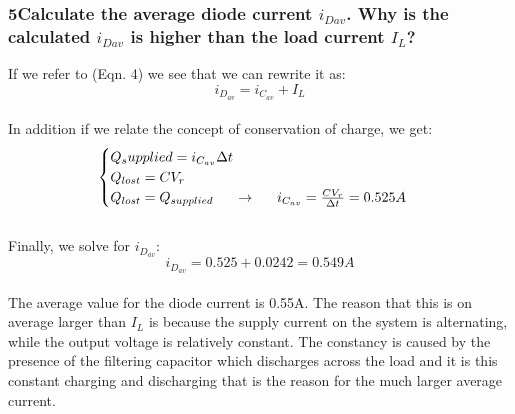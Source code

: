 \documentclass[]{article}
\begin{document}
	\subsubsection*{5\indent Calculate the average diode current $i_{Dav}$. Why is the calculated $i_{Dav}$ is higher than the load current $I_L$?}
	{
		If we refer to (Eqn. 4) we see that we can rewrite it as:
		\begin{equation}
			{ i_{D_{av}} = i_{C_{av}} + I_L }
		\end{equation}
		\\
		In addition if we relate the concept of conservation of charge, we get:
		\begin{equation}
			\begin{cases}
				Q_supplied = i_{C_{av}}\Delta t
				\\
				Q_{lost} = CV_r
				\\
				Q_{lost} = Q_{supplied} \indent\rightarrow\indent i_{C_{av}} = \frac{CV_r}{\Delta t} = 0.525A
				\\
			\end{cases}
		\end{equation}
		\\
		Finally, we solve for $i_{D_{av}}$:
		\begin{equation}
			i_{D_{av}} = 0.525 + 0.0242 = 0.549A
		\end{equation}
		\\
		The average value for the diode current is 0.55A. The reason that this is on average larger than $I_L$ is because the supply current on the system is alternating, while the output voltage is relatively constant. The constancy is caused by the presence of the filtering capacitor which discharges across the load and it is this constant charging and discharging that is the reason for the much larger average current.
	}
	
\end{document}
